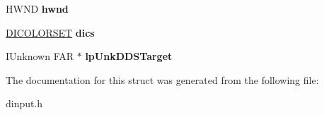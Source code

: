 \begin{DoxyCompactItemize}
\item 
\hypertarget{struct___d_i_c_o_n_f_i_g_u_r_e_d_e_v_i_c_e_s_p_a_r_a_m_s_w_a69322ba84dc3f7f004f4c0d732911654}{H\-W\-N\-D {\bfseries hwnd}}\label{struct___d_i_c_o_n_f_i_g_u_r_e_d_e_v_i_c_e_s_p_a_r_a_m_s_w_a69322ba84dc3f7f004f4c0d732911654}

\item 
\hypertarget{struct___d_i_c_o_n_f_i_g_u_r_e_d_e_v_i_c_e_s_p_a_r_a_m_s_w_aa7c3fc5219fca7fb4d3a1492895960d3}{\hyperlink{struct___d_i_c_o_l_o_r_s_e_t}{D\-I\-C\-O\-L\-O\-R\-S\-E\-T} {\bfseries dics}}\label{struct___d_i_c_o_n_f_i_g_u_r_e_d_e_v_i_c_e_s_p_a_r_a_m_s_w_aa7c3fc5219fca7fb4d3a1492895960d3}

\item 
\hypertarget{struct___d_i_c_o_n_f_i_g_u_r_e_d_e_v_i_c_e_s_p_a_r_a_m_s_w_a66e3b38dfdfdbb2b8c345c8d7cec458b}{I\-Unknown F\-A\-R $\ast$ {\bfseries lp\-Unk\-D\-D\-S\-Target}}\label{struct___d_i_c_o_n_f_i_g_u_r_e_d_e_v_i_c_e_s_p_a_r_a_m_s_w_a66e3b38dfdfdbb2b8c345c8d7cec458b}

\end{DoxyCompactItemize}


The documentation for this struct was generated from the following file\-:\begin{DoxyCompactItemize}
\item 
dinput.\-h\end{DoxyCompactItemize}
